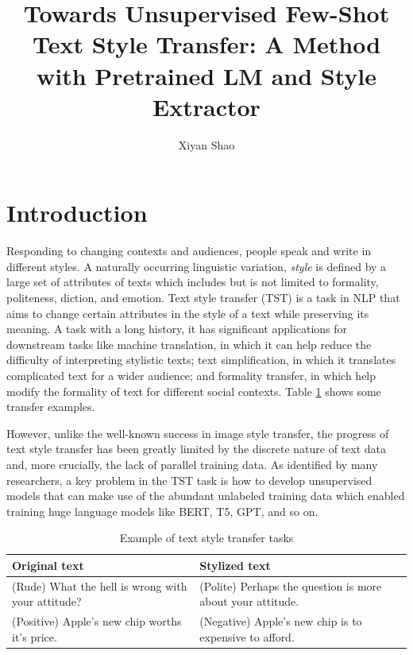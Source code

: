 \documentclass[a4paper]{article}
\author{Xiyan Shao}
\title{Towards Unsupervised Few-Shot Text Style Transfer: A Method with Pretrained LM and Style Extractor}
\begin{document}
\maketitle
\section{Introduction}
Responding to changing contexts and audiences, people speak and write in different styles.
A naturally occurring linguistic variation, \textit{style} is defined by a large set of
attributes of texts which includes but is not limited to formality, politeness, diction, and emotion. Text style transfer (TST) is a task in NLP that aims to change certain attributes in the style of a text while preserving its meaning.
A task with a long history, it has significant applications for downstream tasks like machine translation, in which it can help reduce the difficulty of interpreting stylistic texts;
text simplification, in which it translates complicated text for a wider audience; and formality transfer, in which help modify the formality of text for different social contexts. Table \ref{tab:original_and_stylized_text} shows some transfer examples.

However, unlike the well-known success in image style transfer, the progress of text
style transfer has been greatly limited by the discrete nature of text data and, more
crucially, the lack of parallel training data. As identified by many researchers, a
key problem in the TST task is how to develop unsupervised models that can make use
of the abundant unlabeled training data which enabled training huge language models
like BERT, T5, GPT, and so on.

\begin{table}[h!]
\centering
\label{tab:original_and_stylized_text}
\begin{tabularx}{\linewidth}{XX}
Original text & Stylized text \\ \midrule 
(Rude) What the hell is wrong with your attitude? & (Polite) Perhaps the question is more about your attitude.\\
(Positive) Apple's new chip worths it's price. & (Negative) Apple's new chip is to expensive to afford.\\
\end{tabularx}
\caption{Example of text style transfer tasks}
\label{tab:original_and_stylized_text}
\end{table}
\end{document}
